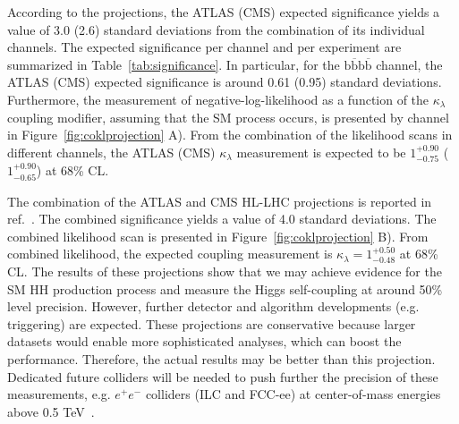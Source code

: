 According to the projections, the ATLAS (CMS) expected significance yields a value of 3.0 (2.6) standard deviations from the combination of its individual channels.  The expected significance per channel and per experiment are summarized in Table~\ref{tab:significance}. In particular, for the $\mathrm{b\overline{b}b\overline{b}}$ channel, the ATLAS (CMS) expected significance is around 0.61 (0.95) standard deviations. Furthermore, the measurement of negative-log-likelihood as a function of the $\kappa_{\lambda}$ coupling modifier, assuming that the SM process occurs, is presented by channel in Figure~\ref{fig:coklprojection} A). From the combination of the likelihood scans in different channels, the ATLAS (CMS) $\kappa_{\lambda}$ measurement is expected to be $1^{+0.90}_{-0.75}$ ($1^{+0.90}_{-0.65}$) at 68\% CL.

The combination of the ATLAS and CMS HL-LHC projections is reported in ref.~\cite{yellowreport}. The combined significance yields a value of 4.0 standard deviations. The combined likelihood scan is presented in Figure~\ref{fig:coklprojection} B). From combined likelihood, the expected coupling measurement is $\kappa_{\lambda}=1^{+0.50}_{-0.48}$ at 68\% CL. The results of these projections show that we may achieve evidence for the SM HH production process and measure the Higgs self-coupling at around 50\% level precision. However, further detector and algorithm developments (e.g. triggering) are expected. These projections are conservative because larger datasets would enable more sophisticated analyses, which can boost the performance. Therefore, the actual results may be better than this projection. Dedicated future colliders will be needed to push further the precision of these measurements, e.g. $e^{+}e^{-}$ colliders (ILC and FCC-ee) at center-of-mass energies above 0.5 TeV~\cite{deBlas:2019rxi}.
